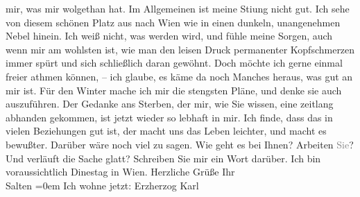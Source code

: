 \begin{ledgroupsized}[t]{13cm}
               mir, was mir wolgethan hat. Im Allgemeinen ist meine Sti{\geminationm}ung nicht gut. Ich sehe von
               diesem schönen Platz aus nach Wien wie in einen
               dunkeln, unangenehmen Nebel hinein. Ich weiß nicht, was werden wird, und fühle meine
               Sorgen, auch wenn mir am wohlsten ist, wie man den leisen Druck permanenter
               Kopfschmerzen immer spürt und sich schließlich daran gewöhnt. Doch möchte ich gerne
               einmal freier athmen können, – ich glaube, {\pb}es
            käme da noch Manches heraus, was gut an mir ist. Für den Winter
            mache ich mir die stengsten Pläne, und denke sie auch auszuführen. Der Gedanke
            ans Sterben, der mir, wie Sie wissen, eine zeitlang abhanden gekommen,
            ist jetzt wieder so lebhaft in mir. Ich finde, dass das in vielen Beziehungen
            gut ist, der macht uns das Leben leichter, und macht es bewußter. Darüber wäre
            noch viel zu sagen.\pend
           \pstart
           Wie geht es bei Ihnen? Arbeiten
            \textcolor{gray}{Sie}? Und verläuft die Sache glatt?
            Schreiben Sie mir ein Wort darüber. Ich bin voraussichtlich
            Dinestag in Wien. Herzliche
            Grüße\pend
           \pstart
           Ihr{\\[\baselineskip]}\spacefill\mbox{Salten}\pend
           \leftskip=0em{}\pstart
           \noindent{}Ich wohne jetzt: Erzherzog Karl\pend
           
         
         \endnumbering{}\end{ledgroupsized}\begin{anhang}\end{anhang}\newcommand{\dateiname}{L03274}\newcommand{\titel}{Felix Salten an Arthur Schnitzler, 3. 9. [1897]}\newcommand{\editorInnen}{Martin Anton Müller und Laura Untner}
      